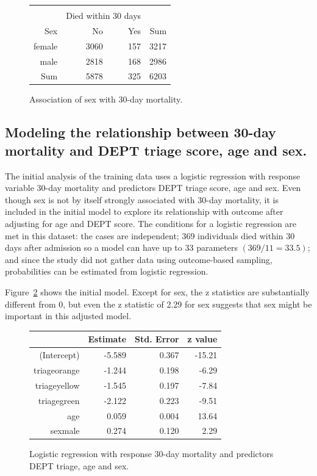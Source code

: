 \begin{figure}[ht]
\centering
\begin{tabular}{rrrr}
  \hline \\
    & \multicolumn{2}{c}{Died within 30 days} & \\
 Sex & No & Yes & Sum \\
  \hline
female & 3060 & 157 & 3217 \\
  male & 2818 & 168 & 2986 \\
  Sum & 5878 & 325 & 6203 \\
   \hline
\end{tabular}
\caption{Association of sex with
       30-day mortality.}
\label{figure:sexMort30Table}
\end{figure}

\subsection{Modeling the relationship between 30-day mortality and DEPT triage score, age and sex.}
\label{section:triageModelDEPTAgeSex}

The initial analysis of the training data uses a logistic regression with response variable 30-day mortality and predictors DEPT triage score, age and sex.  Even though sex is not by itself strongly associated with 30-day mortality, it is included in the initial model to explore its relationship with outcome after adjusting for age and DEPT score.   The conditions for a logistic regression are met in this dataset: the cases are independent; 369 individuals died within 30 days after admission so a model can have up to 33 parameters $(369/11 = 33.5)$; and since the study did not gather data using outcome-based sampling, probabilities can be estimated from logistic regression.  


Figure~\ref{figure:triageAgeSexMort30logreg} shows the initial model. Except for sex, the z statistics are substantially different from 0, but even the z statistic of 2.29 for sex suggests that sex might be important in this adjusted model. 

\begin{figure}[ht]
\centering
\begin{tabular}{rrrr}
  \hline
 & Estimate & Std. Error & z value  \\
  \hline
(Intercept) & -5.589 & 0.367 & -15.21  \\
  triageorange & -1.244 & 0.198 & -6.29  \\
  triageyellow & -1.545 & 0.197 & -7.84  \\
  triagegreen & -2.122 & 0.223 & -9.51  \\
  age & 0.059 & 0.004 & 13.64  \\
  sexmale & 0.274 & 0.120 & 2.29  \\
   \hline
\end{tabular}
\caption{Logistic regression with response 30-day mortality and
       predictors DEPT triage, age and sex.}
\label{figure:triageAgeSexMort30logreg}
\end{figure}

